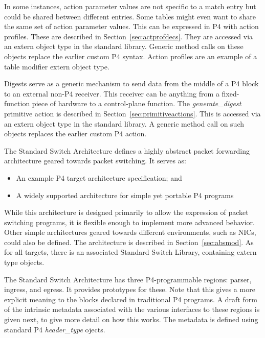 In some instances, action parameter values are not specific to a match entry but
could be shared between different entries. Some tables might even want to share
the same set of action parameter values. This can be expressed in P4 with
action profiles.  These are described in Section~\ref{sec:actprofdecs}.  They
are accessed via an extern object type in the standard library.
Generic method calls on these objects replace the earlier custom P4 syntax.
Action profiles are an example of a table modifier extern object type.


Digests serve as a generic mechanism to send data from the middle of a P4 block
to an external non-P4 receiver. This receiver can be anything from a
fixed-function piece of hardware to a control-plane function.  The
\textit{generate_digest} primitive action is described in
Section~\ref{sec:primitiveactions}.  This is accessed via an extern object
type in the standard library.  A generic method call on such objects replaces
the earlier custom P4 action.


The Standard Switch Architecture defines a highly abstract packet forwarding
architecture geared towards packet switching.  It serves as:
\begin{itemize}
\item
An example P4 target architecture specification; and
\item
A widely supported architecture for simple yet portable P4 programs
\end{itemize}
While this architecture is designed primarily to allow the expression of packet
switching programs, it is flexible enough to implement more advanced behavior.
Other simple architectures geared towards different environments, such as NICs,
could also be defined.  The architecture is described in
Section~\ref{sec:absmod}.  As for all targets, there is an associated
Standard Switch Library, containing extern type objects.


The Standard Switch Architecture has three P4-programmable regions: parser,
ingress, and egress.  It provides prototypes for these.  Note that this gives
a more explicit meaning to the blocks declared in traditional P4 programs.
A draft form of the intrinsic metadata associated with the various interfaces
to these regions is given next, to give more detail on how this works.
The metadata is defined using standard P4 \textit{header_type} ojects.


